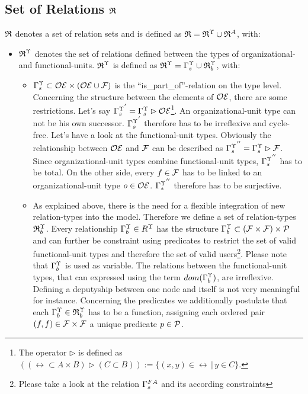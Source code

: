 \subsection{Set of Relations $\mathfrak{R}$}
	$\mathfrak{R}$ denotes a set of relation sets and is defined as
	$\mathfrak{R} = {\mathfrak{R}}^{\Upsilon} \cup {\mathfrak{R}}^{A}$, with:

	\begin{itemize}

	\item ${\mathfrak{R}}^{\Upsilon}$ denotes the set of relations defined between the types of organizational- and functional-units.
	${\mathfrak{R}}^{\Upsilon}$ is defined as ${\mathfrak{R}}^{\Upsilon} = {\Gamma}^{\Upsilon}_{s} \cup {\mathfrak{R}}^{\Upsilon}_{b}$, with:
	\begin{itemize}

		\item ${\Gamma}^{\Upsilon}_{s} \subset \mathcal{OE} \times (\mathcal{OE} \cup \mathcal{F})$ is the ``is\_part\_of''-relation on the type level. Concerning the structure between the elements of $\mathcal{OE}$, there are some restrictions. Let's say ${{\Gamma}^{\Upsilon}_{s}}^{'} = {\Gamma}^{\Upsilon}_{s} \rhd \mathcal{OE}$\footnote{The operator $\rhd$ is defined as $((\rel \subset A \times B) \rhd (C \subset B)) := \{(x,y) \in \rel \, \vert \, y \in C \}$.}.
		An organizational-unit type can not be his own successor. ${{\Gamma}^{\Upsilon}_{s}}^{'}$ therefore has to be irreflexive and cycle-free.
		Let's have a look at the functional-unit types. Obviously the relationship between $\mathcal{OE}$ and $\mathcal{F}$ can be described as ${{\Gamma}^{\Upsilon}_{s}}^{''} = {\Gamma}^{\Upsilon}_{s} \rhd \mathcal{F}$. Since organizational-unit types combine functional-unit types, ${{\Gamma}^{\Upsilon}_{s}}^{''}$ has to be total. On the other side, every $f \in \mathcal{F}$ has to be linked to an organizational-unit type $o \in \mathcal{OE}$. ${{\Gamma}^{\Upsilon}_{s}}^{''}$ therefore has to be surjective.

		\item As explained above, there is the need for a flexible integration of new relation-types into the model. Therefore we define a set of relation-types ${\mathfrak{R}}^{\Upsilon}_{b}$. Every relationship ${\Gamma}^{\Upsilon}_{b} \in R^{\Upsilon}$ has the structure ${\Gamma}^{\Upsilon}_{b} \subset (\mathcal{F} \times \mathcal{F}) \times \mathcal{P}$ and can further be constraint using predicates to restrict the set of valid functional-unit types and therefore the set of valid users\footnote{Please take a look at the relation ${\Gamma}^{FA}_{s}$ and its according constraints}. Please note that ${\Gamma}^{\Upsilon}_{b}$ is used as variable. The relations between the functional-unit types, that can expressed using the term $dom({\Gamma}^{\Upsilon}_{b})$, are irreflexive. Defining a deputyship between one node and itself is not very meaningful for instance. Concerning the predicates we additionally postulate that each ${\Gamma}^{\Upsilon}_{b} \in {\mathfrak{R}}^{\Upsilon}_{b}$ has to be a function, assigning each ordered pair $(f,f) \in \mathcal{F} \times \mathcal{F}$ a unique predicate $p \in \mathcal{P}$.


\end{itemize}
\end{itemize}
